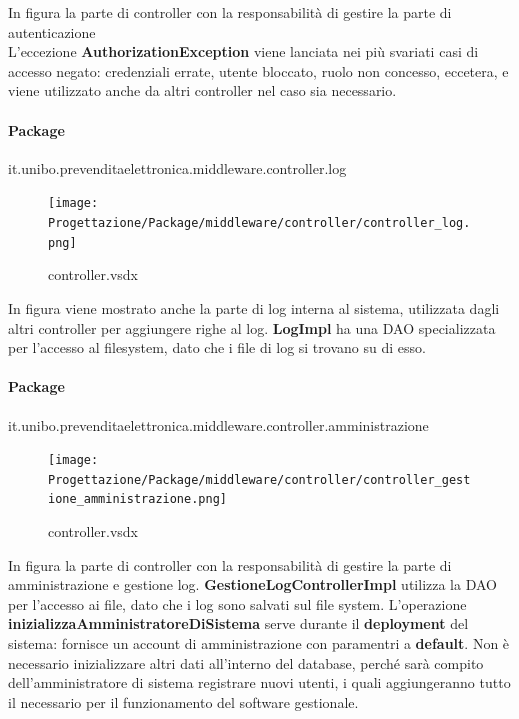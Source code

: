 \documentclass[a4paper]{article}
\begin{document}
In figura la parte di controller con la responsabilità di gestire la parte di autenticazione\\L'eccezione \textbf{AuthorizationException} viene lanciata nei più svariati casi di accesso negato: credenziali errate, utente bloccato, ruolo non concesso, eccetera, e viene utilizzato anche da altri controller nel caso sia necessario.

\newpage

\paragraph{Package} it.unibo.prevenditaelettronica.middleware.controller.log


\begin{figure}[H]
    \texttt{[image: Progettazione/Package/middleware/controller/controller\_log.png]}
    \centering
    \caption{controller.vsdx}
\end{figure}

In figura viene mostrato anche la parte di log interna al sistema, utilizzata dagli altri controller per aggiungere righe al log. \textbf{LogImpl} ha una DAO specializzata per l'accesso al filesystem, dato che i file di log si trovano su di esso.

\paragraph{Package} it.unibo.prevenditaelettronica.middleware.controller.amministrazione


\begin{figure}[H]
    \texttt{[image: Progettazione/Package/middleware/controller/controller\_gestione\_amministrazione.png]}
    \centering
    \caption{controller.vsdx}
\end{figure}

In figura la parte di controller con la responsabilità di gestire la parte di amministrazione e gestione log. \textbf{GestioneLogControllerImpl} utilizza la DAO per l'accesso ai file, dato che i log sono salvati sul file system. L'operazione \textbf{inizializzaAmministratoreDiSistema} serve durante il \textbf{deployment} del sistema: fornisce un account di amministrazione con paramentri a \textbf{default}. Non è necessario inizializzare altri dati all'interno del database, perché sarà compito dell'amministratore di sistema registrare nuovi utenti, i quali aggiungeranno tutto il necessario per il funzionamento del software gestionale.
\end{document}
